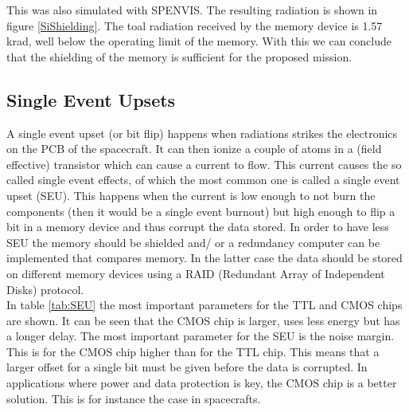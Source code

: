 This was also simulated with SPENVIS. The resulting radiation is shown in figure \ref{SiShielding}. The toal radiation received by the memory device is 1.57\,krad, well below the operating limit of the memory. With this we can conclude that the shielding of the memory is sufficient for the proposed mission.


\subsection{\label{subsec:SEU}Single Event Upsets}
A single event upset (or bit flip) happens when radiations strikes the electronics on the PCB of the spacecraft. It can then ionize a couple of atoms in a (field effective) transistor which can cause a current to flow. This current causes the so called single event effects, of which the most common one is called a single event upset (SEU). This happens when the current is low enough to not burn the components (then it would be a single event burnout) but high enough to flip a bit in a memory device and thus corrupt the data stored. In order to have less SEU the memory should be shielded and/ or a redundancy computer can be implemented that compares memory. In the latter case the data should be stored on different memory devices using a RAID (Redundant Array of Independent Disks) protocol.\\

In table \ref{tab:SEU} the most important parameters for the TTL and CMOS chips are shown. It can be seen that the CMOS chip is larger, uses less energy but has a longer delay. The most important parameter for the SEU is the noise margin. This is for the CMOS chip higher than for the TTL chip. This means that a larger offset for a single bit must be given before the data is corrupted. In applications where power and data protection is key, the CMOS chip is a better solution. This is for instance the case in spacecrafts.

